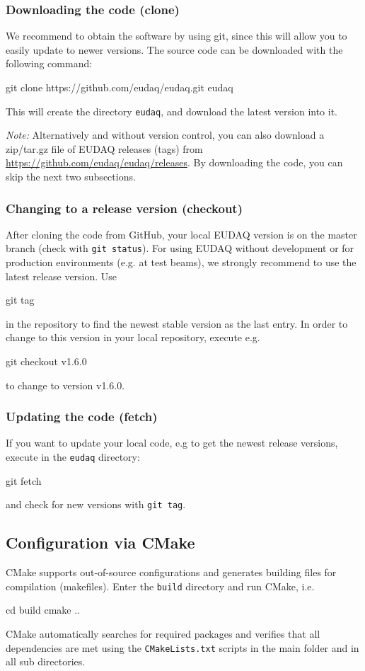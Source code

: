 \subsubsection{Downloading the code (clone)}
We recommend to obtain the software by using git,
since this will allow you to easily update to newer versions.
The source code can be downloaded with the following command:
\begin{listing}[mybash]
git clone https://github.com/eudaq/eudaq.git eudaq
\end{listing}
This will create the directory \texttt{eudaq}, and download the latest
version into it. 

\textit{Note:} Alternatively and without version control, you can also download a zip/tar.gz file of EUDAQ releases (tags) from \url{https://github.com/eudaq/eudaq/releases}. 
By downloading the code, you can skip the next two subsections. 

\subsubsection{Changing to a release version (checkout)}
After cloning the code from GitHub, your local EUDAQ version is on the master branch (check with \texttt{git status}).  
For using EUDAQ without development or for production environments (e.g. at test beams), we strongly recommend to use the latest release version. 
Use 
\begin{listing}[mybash]
git tag 
\end{listing}
in the repository to find the newest stable version as the last entry.
In order to change to this version in your local repository, execute e.g. 
\begin{listing}[mybash]
git checkout v1.6.0
\end{listing}
to change to version v1.6.0.

\subsubsection{Updating the code (fetch)}
If you want to update your local code, e.g to get the newest release versions, execute in the \texttt{eudaq} directory: 
\begin{listing}[mybash]
git fetch
\end{listing}
and check for new versions with \texttt{git tag}. 


\subsection{Configuration via CMake}
\label{sec:cmake}
CMake supports out-of-source configurations and generates building files for compilation (makefiles). 
Enter the \texttt{build} directory and run CMake, i.e.
\begin{listing}[mybash]
cd build
cmake ..
\end{listing}
CMake automatically searches for required packages and verifies that all dependencies are met using the \texttt{CMakeLists.txt} scripts in the main folder and in all sub directories. 

